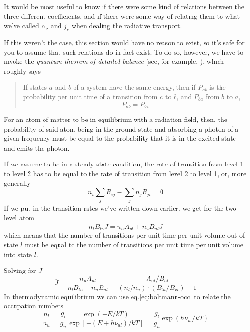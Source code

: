 It would be most useful to know if there were some kind of relations between the three different coefficients, and if there were some way of relating them to what we've called $\alpha_{\nu}$ and $j_{\nu}$ when dealing the radiative transport. 
\par If this weren't the case, this section would have no reason to exist, so it's safe for you to assume that such relations do in fact exist. To do so, however, we have to invoke the \emph{quantum theorem of detailed balance} (see, for example, \cite{goodstein}), which roughly says 
\begin{quotation}
    If states $a$ and $b$ of a system have the same energy, then if $P_{ab}$ is the probability per unit time of a transition from $a$ to $b$, and $P_{ba}$ from $b$ to $a$,
    $$ P_{ab} = P_{ba} $$
\end{quotation}
For an atom of matter to be in equilibrium with a radiation field, then, the probability of said atom being in the ground state and absorbing a photon of a given frequency must be equal to the probability that it is in the excited state and emits the photon.
\par If we assume to be in a steady-state condition, the rate of transition from level 1 to level 2 has to be equal to the rate of transition from level 2 to level 1, or, more generally
\begin{equation*}
    n_{i}\sum_{j}R_{ij} - \sum_{j}n_{j}R_{ji} = 0
\end{equation*}
If we put in the transition rates we've written down earlier, we get for the two-level atom
\begin{equation*}
    n_{l}B_{lu}\overline{J} = n_{u}A_{ul}+n_{u}B_{ul}\overline{J}
\end{equation*}
which means that the number of transitions per unit time per unit volume out of state $l$ must be equal to the number of transitions per unit time per unit volume into state $l$.
\par Solving for $\overline{J}$
\begin{equation}
    \overline{J} = \frac{n_{u}A_{ul}}{n_{l}B_{lu}-n_{u}B_{ul}} = \frac{A_{ul}/B_{ul}}{(n_{l}/n_{u})\cdot(B_{lu}/B_{ul})-1}
\end{equation}
In thermodynamic equilibrium we can use eq.\ref{eq:boltmann-occ} to relate the occupation numbers
\begin{equation*}
    \frac{n_{l}}{n_{u}} = \frac{g_{l}}{g_{u}}\frac{\exp\left(-E/kT\right)}{\exp\left[-(E+h\nu_{ul})/kT\right]} = \frac{g_{l}}{g_{u}}\exp\left(h\nu_{ul}/kT\right)
\end{equation*}
